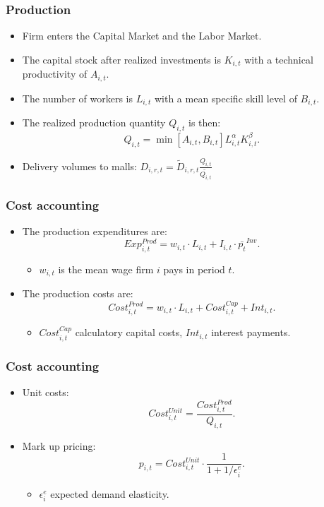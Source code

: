 \documentclass{beamer}
\begin{document}
\frame
{

  \frametitle{Production} 
\begin{itemize}

\item Firm enters the Capital Market and the Labor Market.

\item The capital stock after realized investments is $K_{i,t}$ with a technical productivity of $A_{i,t}.$

\item The number of workers is $L_{i,t}$ with a mean specific skill level of $B_{i,t}.$

\item The realized production quantity $Q_{i,t}$ is then:
\[
Q_{i,t}=  \min \left[A_{i,t},B_{i,t}\right] L_{i,t}^{\alpha}K_{i,t}^{\beta}.
\]

\item Delivery volumes to malls: $D_{i,r,t}= \tilde{D}_{i,r,t}\frac{Q_{i,t}}{\tilde{Q_{i,t}}}$

\end{itemize}
  
}

\frame
{

  \frametitle{Cost accounting} 
\begin{itemize}

\item The production expenditures are: 
\[
Exp^{Prod}_{i,t}=  w_{i,t} \cdot L_{i,t} + I_{i,t}\cdot \bar{p_{t}}^{Inv}.
\]
\begin{itemize}
	\item $w_{i,t}$ is the mean wage firm $i$ pays in period $t$. 
\end{itemize}
\item The production costs are: 
\[Cost^{Prod}_{i,t}= w_{i,t} \cdot L_{i,t} + Cost^{Cap}_{i,t}+ Int_{i,t}.
\] 
\begin{itemize}
	\item $Cost^{Cap}_{i,t}$ calculatory capital costs, $Int_{i,t}$ interest payments.
\end{itemize}
\end{itemize}
}
\frame
{

  \frametitle{Cost accounting} 
\begin{itemize}

\item Unit costs: 
\[
Cost^{Unit}_{i,t}=\frac{Cost^{Prod}_{i,t}}{Q_{i,t}}.
\]
\item Mark up pricing:  \[
p_{i,t}= Cost^{Unit}_{i,t}\cdot \frac{1}{1+1/\epsilon^e_i}.
\]
\begin{itemize}
	\item $\epsilon^e_i$ expected demand elasticity.
\end{itemize}
 
\end{itemize}
  
}
\end{document}
